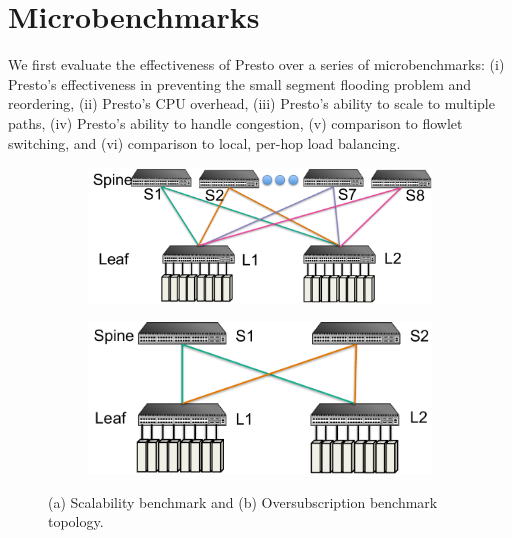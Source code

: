\section{Microbenchmarks}
\label{sec:micro}

We first evaluate the effectiveness of Presto over a series of microbenchmarks: %
(i) Presto's effectiveness in preventing the small segment
flooding problem and reordering, (ii) Presto's CPU overhead, (iii) Presto's ability to scale
to multiple paths, (iv) Presto's ability to handle congestion, (v) comparison to flowlet
switching, and (vi) comparison to local, per-hop load balancing.

\begin{figure}[t]
        \centering
	\begin{subfigure}[b]{0.225\textwidth}
        	\centering
  		\includegraphics[width=\textwidth]{presto/figures/micro_test_topology/micro_scalabilitytest_topology_refined.pdf}
        	\caption{}
		\label{micro_scalability_topology}
	\end{subfigure}
	\begin{subfigure}[b]{0.225\textwidth}
                \centering
		\includegraphics[width=\textwidth]{presto/figures/micro_test_topology/micro_congestiontest_topology_refined.pdf}
        	\caption{}
		\label{micro_congestion_topology}
	\end{subfigure}
	\caption{(a) Scalability benchmark and (b) Oversubscription benchmark topology.}
	\label{micro_topology}
\end{figure}

